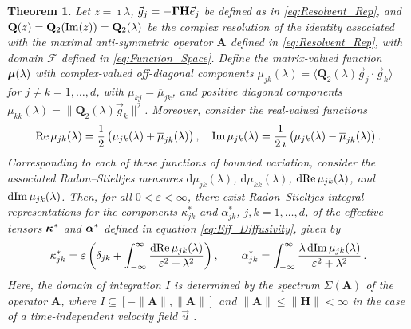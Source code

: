 \documentclass[11pt]{amsart}
\renewcommand{\d}{\mathrm{d}}
\newcommand{\Hb}{\mathbf{H}}
\newcommand{\Ab}{\mathbf{A}}
\newcommand{\Qb}{\mathbf{Q}}
\newcommand{\Fs}{\mathscr{F}}
\newcommand\bmu{\mbox{\boldmath${\mu}$}}
\newcommand\balpha{\mbox{\boldmath${\alpha}$}}
\newcommand\bkappa{\mbox{\boldmath${\kappa}$}}
\newcommand\bGamma{\mbox{\boldmath${\Gamma}$}}
\newtheorem{theorem}{Theorem}[section]
\begin{document}
\begin{theorem}\label{thm:Integral_Reps}
%
Let $z=\imath\lambda$, $\vec{g}_j=-\bGamma\Hb\vec{e}_j$ be defined as in
\eqref{eq:Resolvent_Rep}, and $\Qb(z)=\Qb_2({\rm Im}(z))=\Qb_2(\lambda)$ be 
the complex resolution of the identity associated with the maximal
anti-symmetric operator $\Ab$ defined in \eqref{eq:Resolvent_Rep}, with
domain $\Fs$ defined in \eqref{eq:Function_Space}. Define the
matrix-valued function $\bmu(\lambda)$ with complex-valued off-diagonal
components $\mu_{jk}(\lambda)=\langle\Qb_2(\lambda)\vec{g}_j\cdot\vec{g}_k\rangle$ for $j\neq k=1,\ldots,d$,
with $\mu_{kj}=\overline{\mu}_{jk}$, and positive diagonal components
$\mu_{kk}(\lambda)=\|\Qb_2(\lambda)\vec{g}_k\|^2$.  Moreover, consider the real-valued
functions   
%
\begin{align}\label{eq:Fns_Bounded_Var}
  {\rm Re}\,\mu_{jk}(\lambda)
         =\frac{1}{2}\left(\mu_{jk}(\lambda)+\overline{\mu}_{jk}(\lambda)\right), \quad
  {\rm Im}\,\mu_{jk}(\lambda)
         =\frac{1}{2\,\imath}\left(\mu_{jk}(\lambda)-\overline{\mu}_{jk}(\lambda)\right).
\end{align}
%
Corresponding to each of these functions of bounded variation, 
consider the associated 
Radon--Stieltjes measures $\d\mu_{jk}(\lambda)$, $\d\mu_{kk}(\lambda)$, $\d{\rm
  Re}\,\mu_{jk}(\lambda)$, and $\d{\rm Im}\,\mu_{jk}(\lambda)$. Then, for all $0<\varepsilon<\infty$,
there exist Radon--Stieltjes integral representations for the
components $\kappa^*_{jk}$ and $\alpha^*_{jk}$, $j,k=1,\ldots,d$, of the effective
tensors $\bkappa^*$ and $\balpha^*$ defined in equation
\eqref{eq:Eff_Diffusivity}, given by          
%
\begin{align}\label{eq:Integral_Rep_kappa*}
  \kappa^*_{jk}=\varepsilon\left(\delta_{jk}+\int_{-\infty}^\infty\frac{\d{\rm Re}\,\mu_{jk}(\lambda)}{\varepsilon^2+\lambda^2}\right),
  \qquad
  \alpha^*_{jk}=\int_{-\infty}^\infty\frac{\lambda\,\d{\rm Im}\,\mu_{jk}(\lambda)}{\varepsilon^2+\lambda^2}\,.       
\end{align}
%
Here, the domain of integration $I$ is determined by the spectrum
$\Sigma(\Ab)$ of the operator $\Ab$, where $I\subseteq[-\|\Ab\|,\|\Ab\|]$ and
$\|\Ab\|\leq\|\Hb\|<\infty$ in the case of a time-independent velocity field
$\vec{u}$ \cite{Reed-1980}.     
%
\end{theorem}
\end{document}
